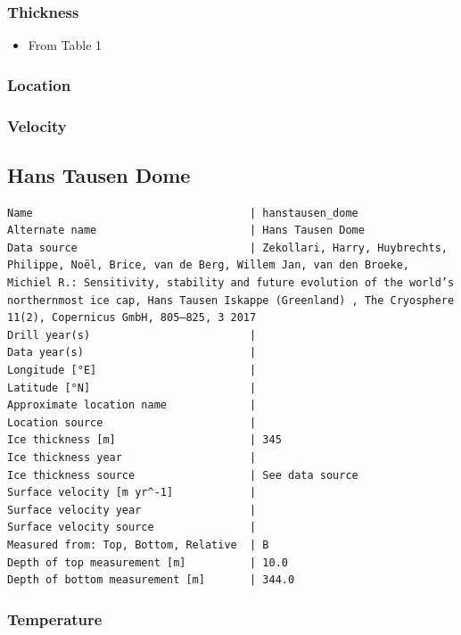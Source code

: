 \documentclass[article,a4paper,times,11pt,twoside]{article}
\begin{document}
\subsubsection{Thickness}
\label{sec:org36efb7f}

\begin{itemize}
\item From \textcite{harrington_2015} Table 1
\end{itemize}

\subsubsection{Location}
\label{sec:org5e09c1e}

\subsubsection{Velocity}
\label{sec:org25fd809}
\clearpage
\subsection{Hans Tausen Dome}
\label{sec:org55070a6}
\begin{verbatim}
Name                                  | hanstausen_dome
Alternate name                        | Hans Tausen Dome
Data source                           | Zekollari, Harry, Huybrechts, Philippe, Noël, Brice, van de Berg, Willem Jan, van den Broeke, Michiel R.: Sensitivity, stability and future evolution of the world’s northernmost ice cap, Hans Tausen Iskappe (Greenland) , The Cryosphere 11(2), Copernicus GmbH, 805–825, 3 2017 
Drill year(s)                         | 
Data year(s)                          | 
Longitude [°E]                        | 
Latitude [°N]                         | 
Approximate location name             | 
Location source                       | 
Ice thickness [m]                     | 345
Ice thickness year                    | 
Ice thickness source                  | See data source
Surface velocity [m yr^-1]            | 
Surface velocity year                 | 
Surface velocity source               | 
Measured from: Top, Bottom, Relative  | B
Depth of top measurement [m]          | 10.0
Depth of bottom measurement [m]       | 344.0
\end{verbatim}

\subsubsection{Temperature}
\label{sec:orgcb48630}
\end{document}
